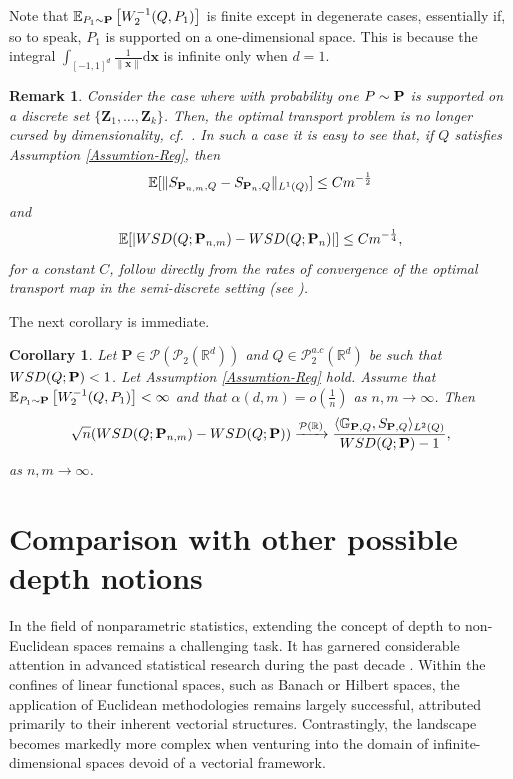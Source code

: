 \documentclass{imsart}
\newtheorem {Corollary}[Proposition]{Corollary}
\newtheorem {Remark}[Proposition]{Remark}
\numberwithin{equation}{section}
\def\Z{\mathbf{Z}}
\def\R{\mathbb{R}}
\def\E{\mathbb{E}}
\def\x{\mathbf{x}}
\def\E{\mathbb E}
\def\x{\mathbf x}
\begin{document}
Note that $\E_{P_1\sim {\bf P}}\left[ W_2^{-1}(Q,P_{1})\right]$ is finite except in degenerate cases, essentially if, so to speak, $P_{1}$ is supported on a one-dimensional space. This is because the integral $\int_{ [-1,1]^d} \frac{1}{\|\x\|}  \mathrm{d} \x$ is infinite only when $d=1$. 





\begin{Remark}
	Consider the case where with probability one $P\sim {\bf P}$ is supported on a discrete set $\{\Z_1, \dots, \Z_k\}$. Then, the optimal transport problem is no longer cursed by dimensionality, cf.~\cite{delbarrio2021centraldisc}. In such a case it is easy to see that, if $Q$ satisfies Assumption \ref{Assumtion-Reg},   then 
	$$ \E[\| S_{{\bf P}_{n,m},Q} -S_{{\bf P}_{n},Q} \|_{L^1(Q)}] \leq C m^{-\frac{1}{2}}  $$
	and 
	$$ \E[|  {\rm WSD}(Q; {\bf P}_{n,m})- {\rm WSD}(Q; {\bf P}_n)| ] \leq  C m^{-\frac{1}{4}}, $$
	for a constant $C$,
	follow directly from the rates of convergence of the optimal transport map in the semi-discrete setting (see \cite{Sadhu.Kato-2024}).
\end{Remark}

The next corollary is immediate.
\begin{Corollary}
	Let  $\mathbf{P}\in \mathcal{P}(\mathcal{P}_2(\R^d)) $ and $Q\in \mathcal{P}^{a.c}_2(\R^d) $ be such that $ {\rm WSD}(Q; {\bf P} )<1$.
	Let Assumption \ref{Assumtion-Reg} hold. 
	Assume that $\E_{P_1\sim {\bf P}}\left[ W_2^{-1}(Q,P_{1})\right] < \infty$
	and that $\alpha(d,m) = o \left( \frac{1}{n} 
	\right) $ as $n,m \to \infty$. Then
	$$ \sqrt{n}( {\rm WSD}(Q; {\bf P}_{n,m} )- {\rm WSD}(Q; {\bf P} ))\xrightarrow{\mathcal{P}(\mathbb{R})} \frac{\langle \mathbb{G}_{{\bf P},Q}, S_{{\bf P},Q } \rangle_{L^2(Q)} }{ {\rm WSD}(Q; {\bf P} )-1}, $$ 
	as $n,m \to \infty$.
\end{Corollary}



\section{Comparison with other possible depth notions}
\label{section:comparison}
In the field of nonparametric statistics, extending the concept of depth to non-Euclidean spaces remains a challenging task. It has garnered considerable attention in advanced statistical research during the past decade \citep{LopezTukeyMetric, Geenens2023, virta2023spatial}. 
Within the confines of linear functional spaces, such as Banach or Hilbert spaces, the application of Euclidean methodologies remains largely successful, attributed primarily to their inherent vectorial structures. Contrastingly, the landscape becomes markedly more complex when venturing into the domain of infinite-dimensional spaces devoid of a vectorial framework.
\end{document}
